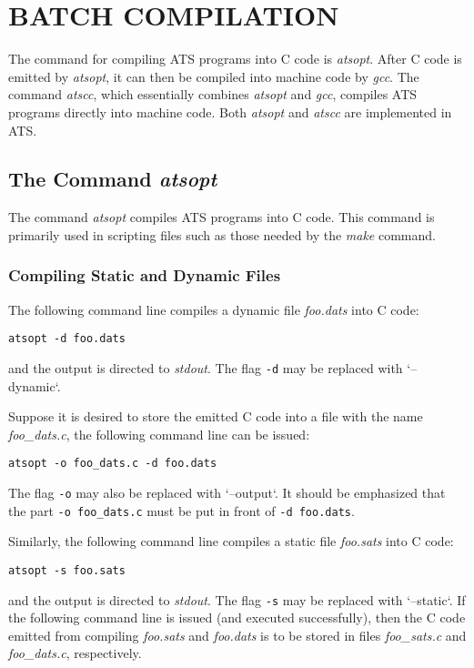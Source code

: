\chapter{BATCH COMPILATION}\label{chapter:batch_compilation}

The command for compiling ATS programs into C code is {\it atsopt}.  After
C code is emitted by {\it atsopt}, it can then be compiled into machine
code by {\it gcc}. The command {\it atscc}, which essentially combines {\it
atsopt} and {\it gcc}, compiles ATS programs directly into machine code.
Both {\it atsopt} and {\it atscc} are implemented in ATS.

\section{The Command {\it atsopt}}
The command {\it atsopt} compiles ATS programs into C code.  This command
is primarily used in scripting files such as those needed by the {\it make}
command.

\subsection{Compiling Static and Dynamic Files}
The following command line compiles a dynamic file {\it foo.dats} into C
code:
\begin{verbatim}
atsopt -d foo.dats
\end{verbatim}
and the output is directed to {\it stdout}.  The flag \verb`-d` may be
replaced with `--dynamic`.

Suppose it is desired to store the emitted C code into a file with the name
{\it foo\_dats.c}, the following command line can be issued:
\begin{verbatim}
atsopt -o foo_dats.c -d foo.dats
\end{verbatim}
The flag \verb`-o` may also be replaced with `--output`.
It should be emphasized that the part
\verb`-o foo_dats.c` must be put in front of \verb`-d foo.dats`.

Similarly, the following command line compiles a static file {\it foo.sats}
into C code:
\begin{verbatim}
atsopt -s foo.sats
\end{verbatim}
and the output is directed to {\it stdout}.  The flag \verb`-s` may be
replaced with `--static`. If the following command line is issued (and
executed successfully), then the C code emitted from compiling {\it
foo.sats} and {\it foo.dats} is to be stored in files {\it foo\_sats.c} and
{\it foo\_dats.c}, respectively.

